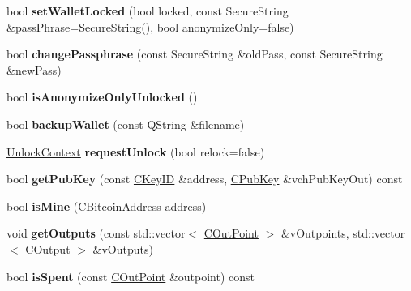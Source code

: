\begin{DoxyCompactItemize}
bool {\bfseries set\+Wallet\+Locked} (bool locked, const Secure\+String \&pass\+Phrase=Secure\+String(), bool anonymize\+Only=false)
\item 
\mbox{\label{class_wallet_model_a67ebff3f267b5c9973c0465184c085a4}} 
bool {\bfseries change\+Passphrase} (const Secure\+String \&old\+Pass, const Secure\+String \&new\+Pass)
\item 
\mbox{\label{class_wallet_model_ad170da7fccb70726a4527d67c8f26340}} 
bool {\bfseries is\+Anonymize\+Only\+Unlocked} ()
\item 
\mbox{\label{class_wallet_model_aa316c19ef41f26ea89f194ab253d3206}} 
bool {\bfseries backup\+Wallet} (const Q\+String \&filename)
\item 
\mbox{\label{class_wallet_model_a9ad552f7942cd22f7a1cd0803b179f06}} 
\mbox{\hyperlink{class_wallet_model_1_1_unlock_context}{Unlock\+Context}} {\bfseries request\+Unlock} (bool relock=false)
\item 
\mbox{\label{class_wallet_model_abe0b4462654768f301d1f758f7907ca2}} 
bool {\bfseries get\+Pub\+Key} (const \mbox{\hyperlink{class_c_key_i_d}{C\+Key\+ID}} \&address, \mbox{\hyperlink{class_c_pub_key}{C\+Pub\+Key}} \&vch\+Pub\+Key\+Out) const
\item 
\mbox{\label{class_wallet_model_a67d21a04d6cb5b3e21e8aab75871ee57}} 
bool {\bfseries is\+Mine} (\mbox{\hyperlink{class_c_bitcoin_address}{C\+Bitcoin\+Address}} address)
\item 
\mbox{\label{class_wallet_model_a5237ea4d9724807a05e2944e5ce6f181}} 
void {\bfseries get\+Outputs} (const std\+::vector$<$ \mbox{\hyperlink{class_c_out_point}{C\+Out\+Point}} $>$ \&v\+Outpoints, std\+::vector$<$ \mbox{\hyperlink{class_c_output}{C\+Output}} $>$ \&v\+Outputs)
\item 
\mbox{\label{class_wallet_model_acb24dd4388e6daef526667fb365a57b1}} 
bool {\bfseries is\+Spent} (const \mbox{\hyperlink{class_c_out_point}{C\+Out\+Point}} \&outpoint) const
\item 
\mbox{\label{class_wallet_model_ae5ce26bba42701b45de766ef11cc9a47}} 

\end{DoxyCompactItemize}
